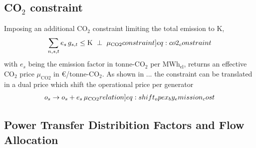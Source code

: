 \documentclass[11pt,twocolumn]{article}
\newcommand{\resultsin}[1]{\hspace{6pt} \bot  \hspace{6pt} #1}
\newcommand{\Forall}[1]{\hspace{10pt} \forall \,\, #1 }
\newcommand{\generation}{g_{s,t}}
\newcommand{\capacityGeneration}{G_{s}}
\newcommand{\capexGeneration}{c_{s}}
\newcommand{\opexGeneration}{o_{s}}
\newcommand{\lmp}[1][n]{\lambda_{#1,t}}
\newcommand{\emission}{e_{s}}
\newcommand{\emissionPrice}{\mu_{\text{CO2}}}
\newcommand{\megawatthour}{MWh$_\text{el}$}
\begin{document}
\subsection{CO$_2$ constraint}

Imposing an additional CO$_2$ constraint limiting the total emission to K,  
\begin{align}
\sum_{n,s,t} \emission \, \generation \le \text{K} \resultsin{\emissionPrice} 
\label[constraint]{eq:co2_constraint}
\end{align}
with $\emission$ being the emission factor in tonne-CO$_2$ per \megawatthour, returns an effective CO$_2$ price $\emissionPrice$ in \euro/tonne-CO$_2$. 
% 
As shown in ... the constraint can be translated in a dual price which shift the operational price per generator
\begin{align}
\opexGeneration \rightarrow \opexGeneration + \emission \, \emissionPrice \label[relation]{eq:shift_opex_by_emission_cost}
\end{align}


\subsection{Power Transfer Distribition Factors and Flow Allocation}
\label{sec:ptdf_and_flow_allocation}
\end{document}
